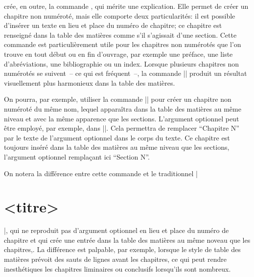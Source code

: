 \frenchlaw crée, en outre, la commande , qui mérite une explication. Elle permet de créer un chapitre non numéroté, mais elle comporte deux particularités:  il est possible d'insérer un texte en lieu et place du numéro de chapitre;  ce chapitre est renseigné dans la table des matières comme s'il s'agissait d'une section. Cette commande est particulièrement utile pour les chapitres non numérotés que l'on trouve en tout début ou en fin d'ouvrage, par exemple une préface, une liste d'abréviations, une bibliographie ou un index. Lorsque plusieurs chapitres non numérotés se suivent~-- ce qui est fréquent~--, la commande |\fakechapter| produit un résultat visuellement plus harmonieux dans la table des matières.

\begin{macro}
\end{macro}

On pourra, par exemple, utiliser la commande || pour créer un chapitre non numéroté du même nom, lequel apparaîtra dans la table des matières au même niveau et avec la même apparence que les sections. L'argument optionnel peut être employé, par exemple, dans ||. Cela permettra de remplacer \enquote{Chapitre N} par le texte de l'argument optionnel dans le corps du texte. Ce chapitre est toujours inséré dans la table des matières au même niveau que les sections, l'argument optionnel remplaçant ici \enquote{Section N}.

On notera la différence entre cette commande et le traditionnel |\chapter*{<titre>}|, qui ne reproduit pas d'argument optionnel en lieu et place du numéro de chapitre et qui crée une entrée dans la table des matières au même noveau que les chapitres,. La différence est palpable, par exemple, lorsque le style de table des matières prévoit des sauts de lignes avant les chapitres, ce qui peut rendre inesthétiques les chapitres liminaires ou conclusifs lorsqu'ils sont nombreux.


